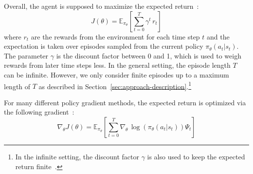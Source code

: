Overall, the agent is supposed to maximize the expected return~\cite{Schulman2016GAE, Peng2018Mimic}:
\begin{equation}
	J (\theta) = \mathbb{E}_{\pi_\theta} \left[ \sum_{t=0}^T \gamma^t \, r_t\right] 
\end{equation}
where $r_t$ are the rewards from the environment for each time step $t$ and the expectation is taken over episodes 
sampled from the current policy $\pi_\theta(a_t | s_t)$. The parameter $\gamma$ is the discount factor between 0 and 1, which is used to 
weigh rewards from later time steps less.
In the general setting, the episode length $T$ can be infinite. However, we only consider finite episodes up to a maximum length of $T$ as 
described in Section~\ref{sec:approach-description}.\footnote{In the infinite setting, the discount factor $\gamma$ is also used to keep the expected return finite~\cite{Peng2018Mimic}.}

For many different policy gradient methods, the expected return is optimized via the following gradient~\cite{Schulman2016GAE}:
\begin{equation}
	\nabla_{\theta} J (\theta) = \mathbb{E}_{\pi_\theta} \left[ \sum_{t=0}^T \nabla_\theta \, \log(\pi_\theta (a_t | s_t)) \Psi_t \right] 
	\label{eq:polupdate}
\end{equation}

